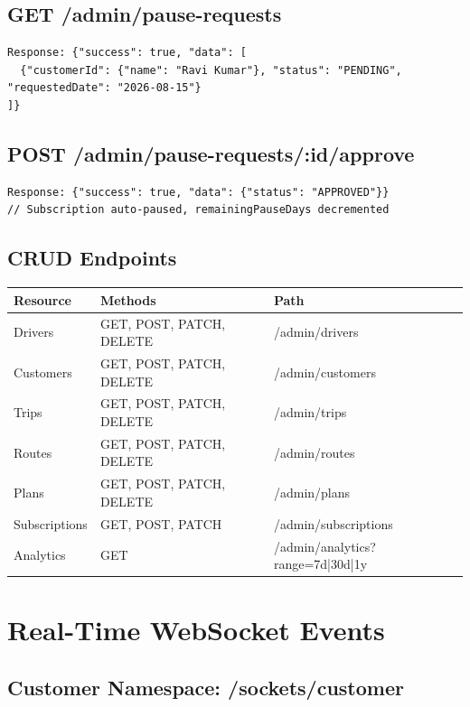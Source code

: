 \documentclass[11pt,a4paper]{article}
\begin{document}
\subsection{GET /admin/pause-requests}
\begin{lstlisting}
Response: {"success": true, "data": [
  {"customerId": {"name": "Ravi Kumar"}, "status": "PENDING", "requestedDate": "2026-08-15"}
]}
\end{lstlisting}

\subsection{POST /admin/pause-requests/:id/approve}
\begin{lstlisting}
Response: {"success": true, "data": {"status": "APPROVED"}}
// Subscription auto-paused, remainingPauseDays decremented
\end{lstlisting}

\subsection{CRUD Endpoints}
\begin{longtable}{lll}
\toprule
\textbf{Resource} & \textbf{Methods} & \textbf{Path} \\
\midrule
Drivers & GET, POST, PATCH, DELETE & /admin/drivers \\
Customers & GET, POST, PATCH, DELETE & /admin/customers \\
Trips & GET, POST, PATCH, DELETE & /admin/trips \\
Routes & GET, POST, PATCH, DELETE & /admin/routes \\
Plans & GET, POST, PATCH, DELETE & /admin/plans \\
Subscriptions & GET, POST, PATCH & /admin/subscriptions \\
Analytics & GET & /admin/analytics?range=7d|30d|1y \\
\bottomrule
\end{longtable}

\section{Real-Time WebSocket Events}

\subsection{Customer Namespace: /sockets/customer}
\end{document}
